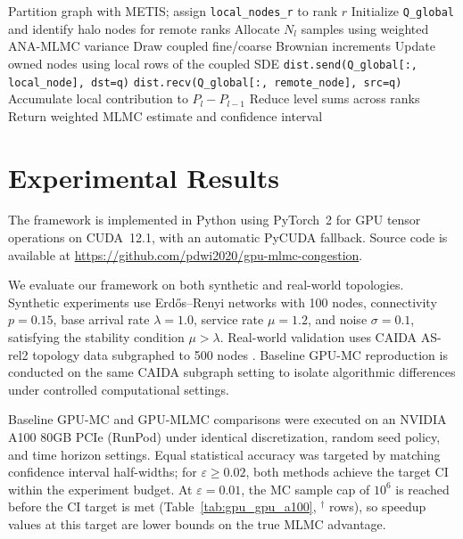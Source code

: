 \documentclass[journal]{IEEEtran}
\begin{document}
\begin{algorithm}[!t]
\caption{Multi-GPU ANA-MLMC Coupled SDE Loop}
\label{alg:multi_gpu}
\begin{algorithmic}[1]
\STATE Partition graph with METIS; assign \texttt{local\_nodes\_r} to rank $r$
\STATE Initialize \texttt{Q\_global} and identify halo nodes for remote ranks
  \STATE Allocate $N_l$ samples using weighted ANA-MLMC variance
    \STATE Draw coupled fine/coarse Brownian increments
      \STATE Update owned nodes using local rows of the coupled SDE
          \STATE \texttt{dist.send(Q\_global[:, local\_node], dst=q)}
          \STATE \texttt{dist.recv(Q\_global[:, remote\_node], src=q)}
        \ENDFOR
      \ENDIF
    \ENDFOR
    \STATE Accumulate local contribution to $P_l-P_{l-1}$
  \ENDFOR
  \STATE Reduce level sums across ranks
\ENDFOR
\STATE Return weighted MLMC estimate and confidence interval
\end{algorithmic}
\end{algorithm}

\section{Experimental Results}

The framework is implemented in Python using PyTorch~2 \cite{pytorch2024} for GPU tensor
operations on CUDA~12.1, with an automatic PyCUDA fallback. Source code is available at
\url{https://github.com/pdwi2020/gpu-mlmc-congestion}.

We evaluate our framework on both synthetic and real-world topologies. Synthetic experiments use
Erd\H{o}s--Renyi networks with 100 nodes, connectivity $p=0.15$, base arrival rate
$\lambda=1.0$, service rate $\mu=1.2$, and noise $\sigma=0.1$, satisfying the stability
condition $\mu>\lambda$. Real-world validation uses CAIDA AS-rel2 topology data subgraphed to
500 nodes \cite{hofstad2016}. Baseline GPU-MC reproduction is conducted on the same CAIDA
subgraph setting to isolate algorithmic differences under controlled computational settings.

Baseline GPU-MC and GPU-MLMC comparisons were executed on an NVIDIA A100 80GB PCIe (RunPod)
under identical discretization, random seed policy, and time horizon settings. Equal statistical
accuracy was targeted by matching confidence interval half-widths; for $\varepsilon\geq0.02$,
both methods achieve the target CI within the experiment budget. At $\varepsilon=0.01$, the MC
sample cap of $10^6$ is reached before the CI target is met
(Table~\ref{tab:gpu_gpu_a100}, $^\dagger$ rows), so speedup values at this target are lower
bounds on the true MLMC advantage.
\end{document}
